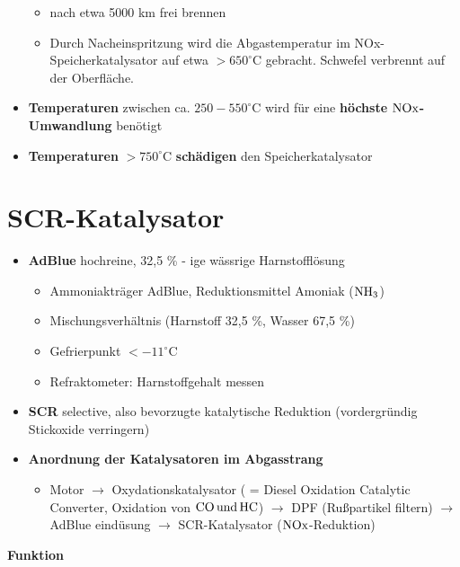 \begin{itemize}
  \begin{itemize}
  \item
    nach etwa 5000 km frei brennen
  \item
    Durch Nacheinspritzung wird die Abgastemperatur im
    NOx-Speicherkatalysator auf etwa $> 650^\circ\text{C}$ gebracht.
    Schwefel verbrennt auf der Oberfläche.
  \end{itemize}
\item
  \textbf{Temperaturen} zwischen ca. $250 - 550^\circ\text{C}$ wird
  für eine \textbf{höchste $\ce{NOx}$-Umwandlung} benötigt
\item
  \textbf{Temperaturen} $> 750^\circ\text{C}$ \textbf{schädigen} den
  Speicherkatalysator
\end{itemize}

\section{SCR-Katalysator}\label{scr-katalysator}

\begin{itemize}
\item
  \textbf{AdBlue} hochreine, 32,5 \% - ige wässrige Harnstofflösung

  \begin{itemize}
  \item
    Ammoniakträger AdBlue, Reduktionsmittel Amoniak ($\ce{NH3}$)
  \item
    Mischungsverhältnis (Harnstoff 32,5 \%, Wasser 67,5 \%)
  \item
    Gefrierpunkt $< -11^\circ\text{C}$
  \item
    Refraktometer: Harnstoffgehalt messen
  \end{itemize}
\item
  \textbf{SCR} selective, also bevorzugte katalytische Reduktion
  (vordergründig Stickoxide verringern)
\item
  \textbf{Anordnung der Katalysatoren im Abgasstrang}

  \begin{itemize}
  \item
    Motor $\to$ Oxydationskatalysator ( = Diesel Oxidation Catalytic
    Converter, Oxidation von $\ce{CO und HC}$) $\to$ DPF
    (Rußpartikel filtern) $\to$ AdBlue eindüsung $\to$
    SCR-Katalysator ($\ce{NOx}$-Reduktion)
  \end{itemize}
\end{itemize}

\textbf{Funktion}

